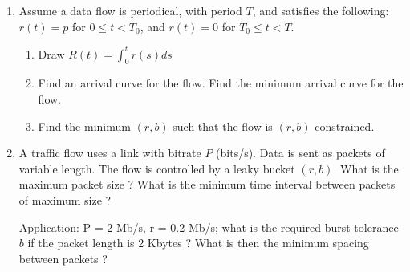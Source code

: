 \begin{problem}
\begin{enumerate}
\item Assume a data flow is periodical, with period $T$, and satisfies the
following: $r(t) = p$ for $0 \leq t < T_{0}$, and
$r(t) = 0$ for $T_{0}\leq t <  T$.
\begin{enumerate}
\item Draw $R(t) = \int_{0}^{t} r(s) ds$

\item Find an arrival curve for the flow. Find the minimum arrival
curve for the flow.
\item Find the minimum $(r, b)$ such that
the flow is $(r, b)$ constrained.


\end{enumerate}

\item A traffic flow uses a link with bitrate $P$ (bits/s). Data is
sent as packets of variable length. The flow is controlled by a leaky
bucket $(r, b)$. What is the maximum packet size ? What is the minimum
time interval between packets of maximum size ?

Application: P = 2 Mb/s, r = 0.2 Mb/s; what is the required burst
tolerance $b$
if the packet length is 2 Kbytes ? What is then the minimum
spacing between packets ?

\end{enumerate}
\end{problem}
